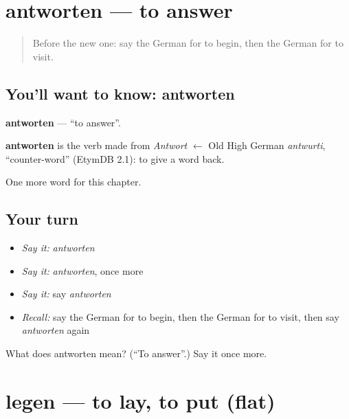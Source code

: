 \section[antworten]{antworten — to answer}

\label{lesson:GE-C139-antworten}



\begin{quote}
Before the new one: say the German for to begin, then the German for to visit.
\end{quote}

\subsection*{You'll want to know: antworten}
\textbf{antworten} — \textquotedblleft{}to answer\textquotedblright{}.

\begin{cousinweb}
\textbf{antworten} is the verb made from \emph{Antwort} $\leftarrow$ Old High German \emph{antwurti}, \textquotedblleft{}counter-word\textquotedblright{} (EtymDB 2.1): to give a word back.
\end{cousinweb}

\begin{grammarlens}[title={What you've built}]
One more word for this chapter.
\end{grammarlens}

\subsection*{Your turn}
\begin{itemize}
\raggedright
  \item \emph{Say it:} \emph{antworten}
  \item \emph{Say it:} \emph{antworten}, once more
  \item \emph{Say it:} say \emph{antworten}
  \item \emph{Recall:} say the German for to begin, then the German for to visit, then say \emph{antworten} again
\end{itemize}

\begin{tcolorbox}[breakable,colback=teal!4,colframe=teal!35!black,title={Before you move on}]
What does antworten mean? (\textquotedblleft{}To answer\textquotedblright{}.) Say it once more.
\end{tcolorbox}
\section[legen]{legen — to lay, to put (flat)}

